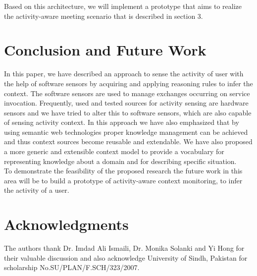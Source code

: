 \documentclass[copyright,creativecommons,noderivs,noncommercial]{eptcs}
\begin{document}
\noindent Based on this architecture, we will implement a prototype that aims to realize the activity-aware meeting scenario that is described in section 3.
\section{Conclusion and Future Work}
In this paper, we have described an approach to sense the activity of user with the help of software sensors by acquiring and applying reasoning rules to infer the context. The software sensors are used to manage exchanges occurring on service invocation. Frequently, used and tested sources for activity sensing are hardware sensors and we have tried to alter this to software sensors, which are also capable of sensing activity context. In this approach we have also emphasized that by using semantic web technologies proper knowledge management can be achieved and thus context sources become reusable and extendable. We have also proposed a more generic and extensible context model to provide a vocabulary for representing knowledge about a domain and for describing specific situation.\\
To demonstrate the feasibility of the proposed research the future work in this area will be to build a prototype of activity-aware context monitoring, to infer the activity of a user.
\section*{Acknowledgments}
The authors thank Dr. Imdad Ali Ismaili, Dr. Monika Solanki and Yi Hong for their valuable discussion and also acknowledge University of Sindh, Pakistan for scholarship No.SU/PLAN/F.SCH/323/2007.


\end{document}
